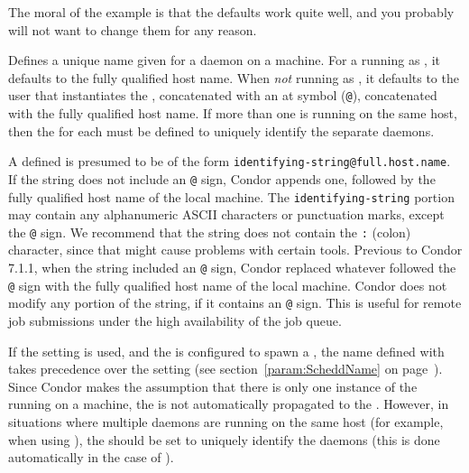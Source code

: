 The moral of the example is that 
the defaults work quite well, and you probably 
will not want to change them for any reason.
\begin{description}

\label{param:MasterName}
\item[\Macro{MASTER\_NAME}]
  Defines a unique name given for a  daemon on a machine.
  For a  running as ,
  it defaults to the fully qualified host name.
  When \emph{not} running as ,
  it defaults to the user that instantiates the
  , concatenated with an at symbol (\verb$@$),
  concatenated with the fully qualified host name.
  If more than one  is running on the same host, 
  then the  for each
   must be defined to uniquely identify the separate
  daemons. 

  A defined  is presumed to be of the form
  \verb$identifying-string@full.host.name$.
  If the string does not include an \verb$@$ sign,
  Condor appends one, followed by the fully qualified host name
  of the local machine.
  The \verb$identifying-string$ portion may contain any
  alphanumeric ASCII characters or punctuation marks, except the \verb$@$ sign.
  We recommend that the string does not contain the \verb$:$ (colon)
  character, since that might cause problems with certain tools.
  Previous to Condor 7.1.1, when the string included
  an \verb$@$ sign, Condor replaced whatever followed the \verb$@$
  sign with the fully qualified host name of the local machine.
  Condor does not modify any portion of the string, if it
  contains an \verb$@$ sign.
  This is useful for remote job submissions under the high availability
  of the job queue.

  If the  setting is used, and the
   is configured to spawn a ,
  the name
  defined with  takes precedence over the
   setting (see section~\ref{param:ScheddName} on
  page~\pageref{param:ScheddName}). 
  Since Condor makes the assumption that there is only one
  instance of the  running on a machine,
  the  is not automatically propagated to the
  .
  However, in situations where multiple  daemons are
  running on the same host (for example, when using ),
  the  should be set to uniquely identify 
  the  daemons
  (this is done automatically in the case of ).


\end{description}
